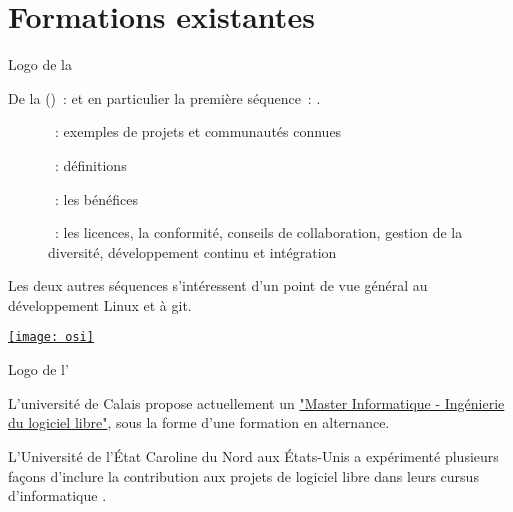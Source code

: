 \chapter{Formations existantes}
\label{chap:existing_teaching}

\begin{marginfigure}
    \href{https://www.linuxfoundation.org/}{}
    \caption{Logo de la }
\end{marginfigure}

De la  () :
  \href{https://www.edx.org/professional-certificate/linuxfoundationx-open-source-software-development-linux-and-git}
  {}
et en particulier la première séquence :
  \href{https://www.edx.org/course/open-source-software-development-linux-for-developers}
  {}.

\begin{description}
    \item[] : exemples de projets et communautés connues
    \item[] : définitions
    \item[] : les bénéfices
    \item[] : les licences, la conformité, conseils de collaboration, gestion de la
        diversité, développement continu et intégration
\end{description}

Les deux autres séquences s'intéressent d'un point de vue général au développement Linux et à git.

\begin{marginfigure}
    \href{https://opensource.org/}{\texttt{[image: osi]}}
    \caption{Logo de l'}
\end{marginfigure}

L'université de Calais propose actuellement un
\href{https://www.univ-littoral.fr/formation/offre-de-formation/masters/master-informatique-ingenierie-du-logiciel-libre/}{"Master
Informatique - Ingénierie du logiciel libre"}, sous la forme d'une formation en alternance.

\label{teaching:ncsu}
L'Université de l'État Caroline du Nord aux États-Unis a expérimenté plusieurs façons d'inclure la
contribution aux projets de logiciel libre dans leurs cursus d'informatique .

